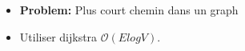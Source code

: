 \begin{frame}
    \frametitle{\problemtitle}
    \begin{itemize}
        \item<+-> \textbf{Problem:} Plus court chemin dans un graph
        \item<+-> Utiliser dijkstra $\mathcal O(E log V)$.
    \end{itemize}
\end{frame}
